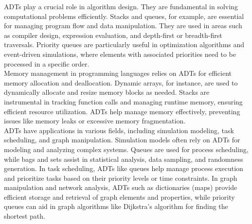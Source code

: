 \noindent ADTs play a crucial role in algorithm design. They are fundamental in solving computational problems efficiently. Stacks and queues, for example, are essential for managing program flow and data manipulation.
They are used in areas such as compiler design, expression evaluation, and depth-first or breadth-first traversals. Priority queues are particularly useful in optimization algorithms and event-driven simulations, where
elements with associated priorities need to be processed in a specific order. \\

\noindent Memory management in programming languages relies on ADTs for efficient memory allocation and deallocation. Dynamic arrays, for instance, are used to dynamically allocate and resize memory blocks as needed.
Stacks are instrumental in tracking function calls and managing runtime memory, ensuring efficient resource utilization. ADTs help manage memory effectively, preventing issues like memory leaks or excessive memory 
fragmentation. \\

\noindent ADTs have applications in various fields, including simulation modeling, task scheduling, and graph manipulation. Simulation models often rely on ADTs for modeling and analyzing complex systems. Queues are used
for process scheduling, while bags and sets assist in statistical analysis, data sampling, and randomness generation. In task scheduling, ADTs like queues help manage process execution and prioritize tasks based on their
priority levels or time constraints. In graph manipulation and network analysis, ADTs such as dictionaries (maps) provide efficient storage and retrieval of graph elements and properties, while priority queues can aid in
graph algorithms like Dijkstra's algorithm for finding the shortest path.